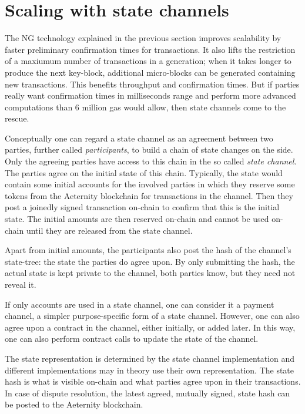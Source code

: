 \section{Scaling with state channels}
\label{sect:channels}

The NG technology explained in the previous section improves
scalability by faster preliminary confirmation times for
transactions. It also lifts the restriction of a maxiumum number of transactions in a
generation; when it takes longer to produce the next key-block,
additional micro-blocks can be generated containing new transactions.
This benefits throughput and confirmation times. But if parties really
want confirmation times in milliseconds range and perform more advanced
computations than 6 million gas would allow, then state channels come to the rescue.

Conceptually one can regard a state channel as an agreement between
two parties, further called \textit{participants}, to build a chain
of state changes on the side. Only the
agreeing parties have access to this chain in the so called
\textit{state channel}. The parties agree on the initial
state of this chain. Typically, the state would
contain some initial accounts for the involved parties in which they
reserve some tokens from the Aeternity blockchain for transactions in
the channel. Then they post a joinedly signed transaction on-chain to
confirm that this is the initial state.
The initial amounts are then reserved on-chain and cannot
be used on-chain until they are released from the state channel.

Apart from initial amounts,
the participants also post the hash of the channel's state-tree: the state the
parties do agree upon. By only submitting the hash, the actual state
is kept private to the channel, both parties know, but they need not
reveal it.

If only accounts are used in a state channel, one can consider it a
payment channel, a simpler purpose-specific form of a state channel.
However, one can also agree upon a contract in the
channel, either initially, or added later. In this way, one can also
perform contract calls to update the state of the channel.

The state representation is determined by the state channel
implementation and different implementations may in theory use
their own representation. The state hash is what is visible on-chain
and what parties agree upon in their transactions.
In case of dispute resolution, the
latest agreed, mutually signed, state hash can be posted to the Aeternity blockchain.

